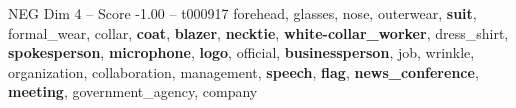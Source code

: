 \begin{textsample}{NEG Dim 4 – Score -1.00 – t000917}  \label{ex:f4_neg_009}
forehead, glasses, nose, outerwear, \textbf{suit}, formal\_wear, collar, \textbf{coat}, \textbf{blazer}, \textbf{necktie}, \textbf{white-collar\_worker}, dress\_shirt, \textbf{spokesperson}, \textbf{microphone}, \textbf{logo}, official, \textbf{businessperson}, job, wrinkle, organization, collaboration, management, \textbf{speech}, \textbf{flag}, \textbf{news\_conference}, \textbf{meeting}, government\_agency, company

\end{textsample}
